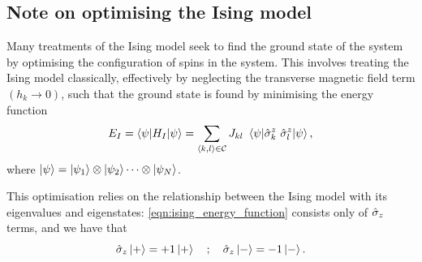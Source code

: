
\par 
\subsection{Note on optimising the Ising model}\label{sec:ising_optimisation}
Many treatments of the Ising model seek to find the ground state
    of the system by optimising the configuration of spins in the system. 
This involves treating the Ising model classically, 
    effectively by neglecting the transverse magnetic field term $(h_k \rightarrow 0)$,
    such that the ground state is found by minimising the energy function
\begin{equation}
    \label{eqn:ising_energy_function}
    E_I = \braket{\psi | H_I | \psi} = 
    \sum_{{ \langle k, l \rangle } \in \mathcal{C}} J_{kl}  \ \braket{ \psi |  \hat{\sigma}_k^z \ \hat{\sigma}_{l}^z | \psi }, 
\end{equation}
    where $\ket{\psi} = \ket{\psi_1} \otimes \ket{\psi_2} \dots \otimes \ket{\psi_N}$. 

This optimisation relies on the relationship between the Ising model with its eigenvalues and eigenstates:
    \cref{eqn:ising_energy_function} consists only of $\hat{\sigma}_{z}$ terms, and we have that 
\begin{equation}
    \sz \ket{+} = +1 \ket{+} \ \ \ ; \ \ \ 
    \sz \ket{-} = -1 \ket{-}. 
\end{equation}

